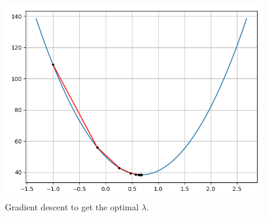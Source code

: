 \documentclass[journal,12pt,twocolumn]{IEEEtran}
\begin{document}
\begin{enumerate}
\begin{enumerate}
        \begin{figure}[!ht]
            \centering
            \includegraphics[width=\columnwidth]{figs/grad_desc.png}
            \caption{Gradient descent to get the optimal $\lambda$.}
            \label{fig:grad-desc}
        \end{figure}


\end{enumerate}
\end{enumerate}
\end{document}

